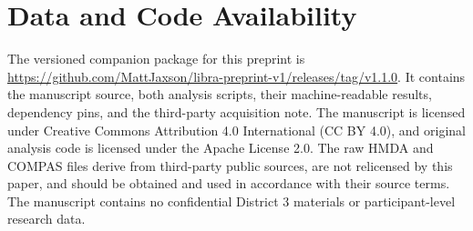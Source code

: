 \documentclass[10pt]{article}
\begin{document}
\section*{Data and Code Availability}

The versioned companion package for this preprint is
\url{https://github.com/MattJaxson/libra-preprint-v1/releases/tag/v1.1.0}.
It contains the manuscript source, both analysis scripts, their machine-readable
results, dependency pins, and the third-party acquisition note.
The manuscript is licensed under Creative Commons Attribution 4.0
International (CC BY 4.0), and original analysis code is licensed under the
Apache License 2.0. The raw HMDA and COMPAS files derive from third-party public
sources, are not relicensed by this paper, and should be obtained and used in
accordance with their source terms. The manuscript
contains no confidential District 3 materials or participant-level research
data.
\end{document}
